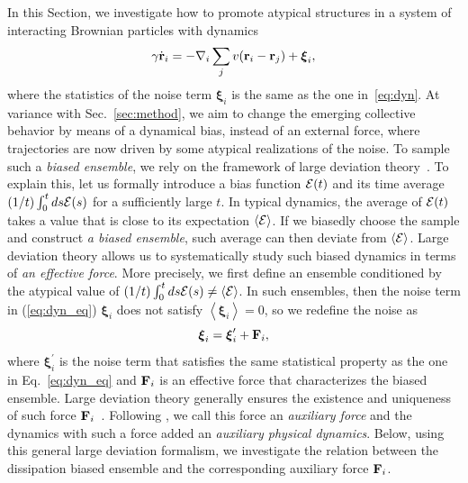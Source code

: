 \documentclass[superscriptaddress, twocolumn, prx, longbibliography, nofootinbib]{revtex4-1}
\newcommand{\tn}[1]{{\color{red}#1}}
\begin{document}
In this Section, we investigate how to promote atypical structures in a system of interacting Brownian particles with dynamics
\begin{equation}\label{eq:dyn_eq}
	\gamma\dot{\bf r}_i = - \nabla_i \sum_j v({\bf r}_i-{\bf r}_j) + {\boldsymbol\xi}_i ,
\end{equation}
where the statistics of the noise term ${\boldsymbol\xi}_i$ is the same as the one in~\eqref{eq:dyn}. At variance with Sec.~\ref{sec:method}, we aim to change the emerging collective behavior by means of a dynamical bias, instead of an external force, where trajectories are now driven by some atypical realizations of the noise. To sample such a {\it biased ensemble}, we rely on the framework of large deviation theory~\cite{Chetrite2013, Jack2010}. 
\tn{To explain this, let us formally introduce a bias function ${\cal E}(t)$ and its time average $(1/t)\int_{0}^{t} ds {\cal E}(s)$ for a sufficiently large $t$.  
In typical dynamics, the average of ${\cal E}(t)$ takes a value that is close to its expectation $\langle \cal E \rangle$. If we biasedly choose the sample and construct {\it a biased ensemble}, such average can then deviate from $\langle \cal E \rangle$. Large deviation theory allows us to systematically study such biased dynamics in terms of {\it an effective force}. More precisely, we first define an ensemble conditioned by the atypical value of $
(1/t)\int_{0}^{t} ds {\cal E}(s) \neq \langle \cal E \rangle$. In such ensembles, then the noise term in (\ref{eq:dyn_eq}) ${\boldsymbol \xi}_i$ does not satisfy $\left \langle {\boldsymbol \xi}_i \right \rangle=0$, so we redefine the noise as
\begin{equation}
{\boldsymbol \xi}_i =  {\boldsymbol \xi}^{\prime}_i + {\bf F}_i,
\end{equation}
where ${\boldsymbol \xi}^{\prime}_i$ is the noise term that satisfies the same statistical property as the one in Eq.~\eqref{eq:dyn_eq} and ${\bf F}_i$ is an effective force that characterizes the biased ensemble. Large deviation theory generally ensures the existence and uniqueness of such force ${\bf F}_i$~\cite{Jack2010,Chetrite2013}. Following \cite{Jack2010}, we call this force an {\it auxiliary force} and the dynamics with such a force added an {\it auxiliary physical dynamics}. Below, using this general large deviation formalism, we investigate the relation between the dissipation biased ensemble and the corresponding auxiliary force ${\bf F}_i$.} 
\end{document}
